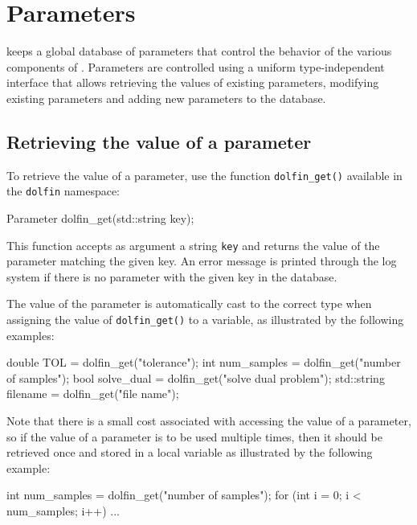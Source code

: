 \chapter{Parameters}
\label{sec:parameters}


\dolfin{} keeps a global database of parameters that control the
behavior of the various components of \dolfin{}. Parameters are
controlled using a uniform type-independent interface that allows
retrieving the values of existing parameters, modifying existing
parameters and adding new parameters to the database.

\section{Retrieving the value of a parameter}

To retrieve the value of a parameter, use the function \texttt{dolfin\_get()}
available in the \texttt{dolfin} namespace:
\begin{code}
Parameter dolfin_get(std::string key);
\end{code}
This function accepts as argument a string \texttt{key} and returns
the value of the parameter matching the given key. An error message is
printed through the log system if there is no parameter with the given
key in the database.

The value of the parameter is automatically cast to the correct type
when assigning the value of \texttt{dolfin\_get()} to a variable, as
illustrated by the following examples:
\begin{code}
double TOL = dolfin_get("tolerance");
int num_samples = dolfin_get("number of samples");
bool solve_dual = dolfin_get("solve dual problem");
std::string filename = dolfin_get("file name");
\end{code}

Note that there is a small cost associated with accessing the value of
a parameter, so if the value of a parameter is to be used multiple
times, then it should be retrieved once and stored in a local variable
as illustrated by the following example:
\begin{code}
int num_samples = dolfin_get("number of samples");
for (int i = 0; i < num_samples; i++)
{
  ...
}
\end{code}

